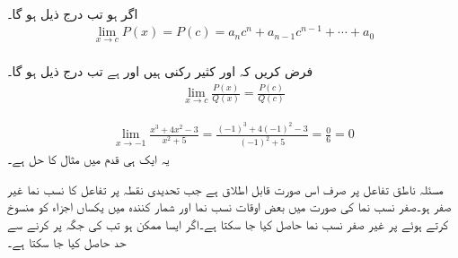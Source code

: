\\
اگر  ہو تب درج ذیل ہو گا۔
\begin{align*}
\lim\limits_{x\to c} P(x)=P(c)=a_nc^n+a_{n-1}c^{n-1}+\cdots+a_0
\end{align*}
\\
فرض کریں کہ  اور  کثیر رکنی ہیں اور  ہے تب درج ذیل ہو گا۔
\begin{align*}
\lim\limits_{x\to c} \frac{P(x)}{Q(x)}=\frac{P(c)}{Q(c)}
\end{align*}

\begin{align*}
\lim_{x\to -1}\frac{x^3+4x^2-3}{x^2+5}=\frac{(-1)^3+4(-1)^2-3}{(-1)^2+5}=\frac{0}{6}=0
\end{align*}
یہ ایک ہی قدم میں مثال  کا حل ہے۔

مسئلہ  ناطق تفاعل پر صرف اس صورت قابل اطلاق ہے جب تحدیدی نقطہ   پر تفاعل کا نسب نما غیر صفر ہو۔صفر نسب نما کی صورت میں بعض اوقات نسب نما اور شمار کنندہ میں یکساں اجزاء  کو منسوخ کرتے ہوئے   پر غیر صفر نسب نما حاصل کیا جا سکتا ہے۔اگر ایسا ممکن ہو تب  کی جگہ  پر کرنے سے حد حاصل کیا جا سکتا ہے۔

